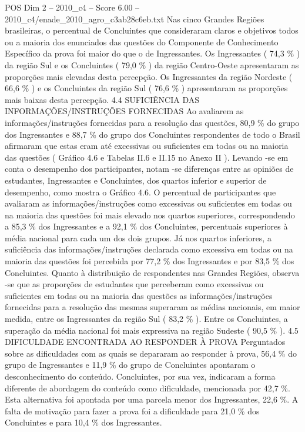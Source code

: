 \begin{textsample}{POS Dim 2 – 2010\_c4 – Score 6.00 – 2010\_c4/enade\_2010\_agro\_c3ab28c6eb.txt}
Nas cinco Grandes Regiões brasileiras, o percentual de Concluintes que consideraram claros e objetivos todos ou a maioria dos enunciados das questões do Componente de Conhecimento Específico da prova foi maior do que o de Ingressantes.
Os Ingressantes ( 74,3 \% ) da região Sul e os Concluintes ( 79,0 \% ) da região Centro-Oeste apresentaram as proporções mais elevadas desta percepção.
Os Ingressantes da região Nordeste ( 66,6 \% ) e os Concluintes da região Sul ( 76,6 \% ) apresentaram as proporções mais baixas desta percepção. 4.4 SUFICIÊNCIA DAS INFORMAÇÕES/INSTRUÇÕES FORNECIDAS Ao avaliarem as informações/instruções fornecidas para a resolução das questões, 80,9 \% do grupo dos Ingressantes e 88,7 \% do grupo dos Concluintes respondentes de todo o Brasil afirmaram que estas eram até excessivas ou suficientes em todas ou na maioria das questões ( Gráfico 4.6 e Tabelas II.6 e II.15 no Anexo II ).
Levando -se em conta o desempenho dos participantes, notam -se diferenças entre as opiniões de estudantes, Ingressantes e Concluintes, dos quartos inferior e superior de desempenho, como mostra o Gráfico 4.6.
O percentual de participantes que avaliaram as informações/instruções como excessivas ou suficientes em todas ou na maioria das questões foi mais elevado nos quartos superiores, correspondendo a 85,3 \% dos Ingressantes e a 92,1 \% dos Concluintes, percentuais superiores à média nacional para cada um dos dois grupos.
Já nos quartos inferiores, a suficiência das informações/instruções declarada como excessiva em todas ou na maioria das questões foi percebida por 77,2 \% dos Ingressantes e por 83,5 \% dos Concluintes.
Quanto à distribuição de respondentes nas Grandes Regiões, observa -se que as proporções de estudantes que perceberam como excessivas ou suficientes em todas ou na maioria das questões as informações/instruções fornecidas para a resolução das mesmas superaram as médias nacionais, em maior medida, entre os Ingressantes da região Sul ( 83,2 \% ).
Entre os Concluintes, a superação da média nacional foi mais expressiva na região Sudeste ( 90,5 \% ). 4.5 DIFICULDADE ENCONTRADA AO RESPONDER À PROVA Perguntados sobre as dificuldades com as quais se depararam ao responder à prova, 56,4 \% do grupo de Ingressantes e 11,9 \% do grupo de Concluintes apontaram o desconhecimento do conteúdo.
Concluintes, por sua vez, indicaram a forma diferente de abordagem do conteúdo como dificuldade, mencionada por 42,7 \%.
Esta alternativa foi apontada por uma parcela menor dos Ingressantes, 22,6 \%.
A falta de motivação para fazer a prova foi a dificuldade para 21,0 \% dos Concluintes e para 10,4 \% dos Ingressantes.

\end{textsample}
